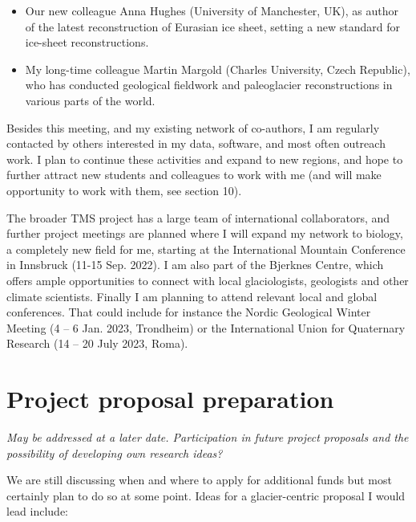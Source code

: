 \documentclass{article}
\newcommand{\guideline}[1]{{\color{color2}\itshape{#1}}}
\begin{document}
    \begin{itemize}
      \item Our new colleague Anna Hughes (University of Manchester, UK), as
        author of the latest reconstruction of Eurasian ice sheet, setting a
        new standard for ice-sheet reconstructions.
      \item My long-time colleague Martin Margold (Charles University, Czech
        Republic), who has conducted geological fieldwork and paleoglacier
        reconstructions in various parts of the world.
    \end{itemize}

    Besides this meeting, and my existing network of co-authors, I am regularly
    contacted by others interested in my data, software, and most often
    outreach work. I plan to continue these activities and expand to new
    regions, and hope to further attract new students and colleagues to work
    with me (and will make opportunity to work with them, see section 10).

    The broader TMS project has a large team of international collaborators,
    and further project meetings are planned where I will expand my network to
    biology, a completely new field for me, starting at the International
    Mountain Conference in Innsbruck (11-15 Sep. 2022). I am also part of the
    Bjerknes Centre, which offers ample opportunities to connect with local
    glaciologists, geologists and other climate scientists. Finally I am
    planning to attend relevant local and global conferences. That could
    include for instance the Nordic Geological Winter Meeting (4 – 6 Jan. 2023,
    Trondheim) or the International Union for Quaternary Research (14 – 20 July
    2023, Roma).


\section{Project proposal preparation}

    \guideline{
        May be addressed at a later date. Participation in future project
        proposals and the possibility of developing own research ideas?}

    We are still discussing when and where to apply for additional funds but
    most certainly plan to do so at some point. Ideas for a glacier-centric
    proposal I would lead include:
\end{document}

